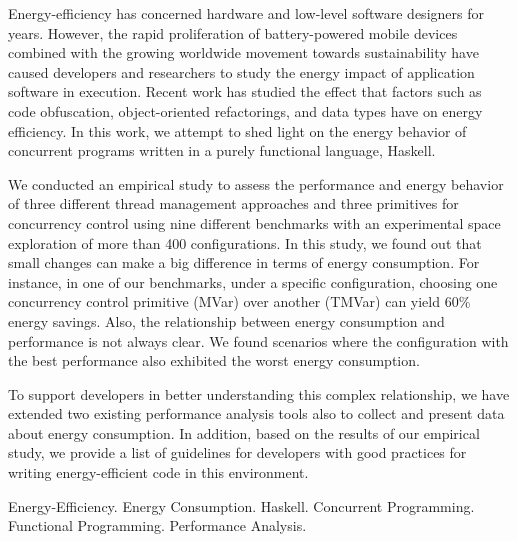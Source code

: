 Energy-efficiency has concerned hardware and low-level software designers for years. However, the rapid proliferation of battery-powered mobile devices combined with the growing worldwide movement towards sustainability have caused developers and researchers to study the energy impact of application software in execution. Recent work has studied the effect that factors such as code obfuscation, object-oriented refactorings, and data types have on energy efficiency. In this work, we attempt to shed light on the energy behavior of concurrent programs written in a purely functional language, Haskell.

We conducted an empirical study to assess the performance and energy behavior of three different thread management approaches and three primitives for concurrency control using nine different benchmarks with an experimental space exploration of more than 400 configurations. In this study, we found out that small changes can make a big difference in terms of energy consumption. For instance, in one of our benchmarks, under a specific configuration, choosing one concurrency control primitive (MVar) over another (TMVar) can yield 60\% energy savings. Also, the relationship between energy consumption and performance is not always clear. We found scenarios where the configuration with the best performance also exhibited the worst energy consumption.

To support developers in better understanding this complex relationship, we have extended two existing performance analysis tools also to collect and present data about energy consumption. In addition, based on the results of our empirical study, we provide a list of guidelines for developers with good practices for writing energy-efficient code in this environment.

\begin{keywords}
Energy-Efficiency. Energy Consumption. Haskell. Concurrent Programming. Functional Programming. Performance Analysis.
\end{keywords}
